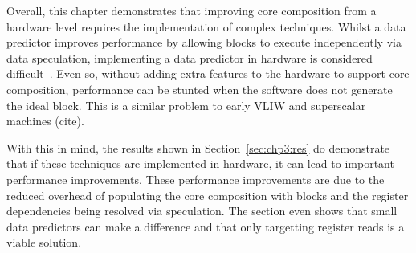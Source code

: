 Overall, this chapter demonstrates that improving core composition from a hardware level requires the implementation of complex techniques.
Whilst a data predictor improves performance by allowing blocks to execute independently via data speculation, implementing a data predictor in hardware is considered difficult~\cite{peraisBeBop2015}.
Even so, without adding extra features to the hardware to support core composition, performance can be stunted when the software does not generate the ideal block.
This is a similar problem to early VLIW and superscalar machines (cite).

With this in mind, the results shown in Section~\ref{sec:chp3:res} do demonstrate that if these techniques are implemented in hardware, it can lead to important performance improvements.
These performance improvements are due to the reduced overhead of populating the core composition with blocks and the register dependencies being resolved via speculation.
The section even shows that small data predictors can make a difference and that only targetting register reads is a viable solution.